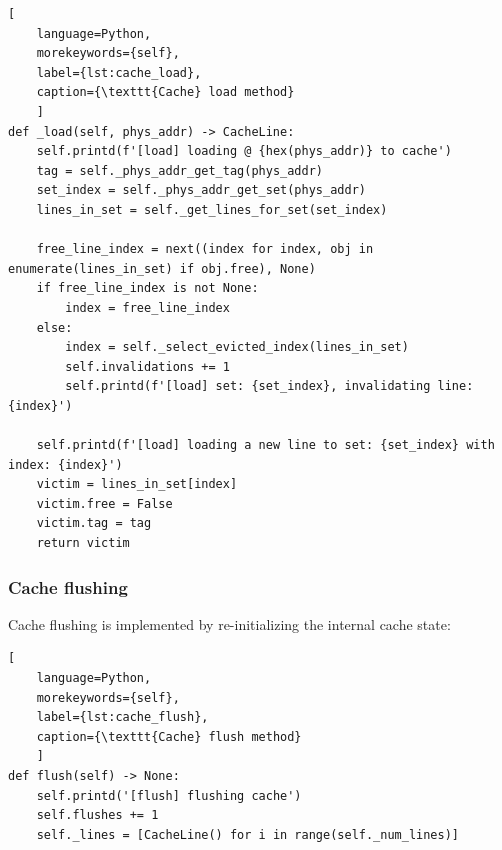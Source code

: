 \begin{center}
\centering
\begin{minipage}{\linewidth}
\begin{lstlisting}[
    language=Python,
	morekeywords={self},
    label={lst:cache_load},
    caption={\texttt{Cache} load method}
    ]
def _load(self, phys_addr) -> CacheLine:
    self.printd(f'[load] loading @ {hex(phys_addr)} to cache')
    tag = self._phys_addr_get_tag(phys_addr)
    set_index = self._phys_addr_get_set(phys_addr)
    lines_in_set = self._get_lines_for_set(set_index)

    free_line_index = next((index for index, obj in enumerate(lines_in_set) if obj.free), None)
    if free_line_index is not None:
        index = free_line_index
    else:
        index = self._select_evicted_index(lines_in_set)
        self.invalidations += 1
        self.printd(f'[load] set: {set_index}, invalidating line: {index}')

	self.printd(f'[load] loading a new line to set: {set_index} with index: {index}')
    victim = lines_in_set[index]
    victim.free = False
    victim.tag = tag
    return victim
\end{lstlisting}
\end{minipage}
\end{center}

\subsubsection*{Cache flushing}
\noindent Cache flushing is implemented by re-initializing the internal cache state:

\begin{center}
\centering
\begin{minipage}{\linewidth}
\begin{lstlisting}[
    language=Python,
	morekeywords={self},
    label={lst:cache_flush},
    caption={\texttt{Cache} flush method}
    ]
def flush(self) -> None:
    self.printd('[flush] flushing cache')
    self.flushes += 1
    self._lines = [CacheLine() for i in range(self._num_lines)]
\end{lstlisting}
\end{minipage}
\end{center}


